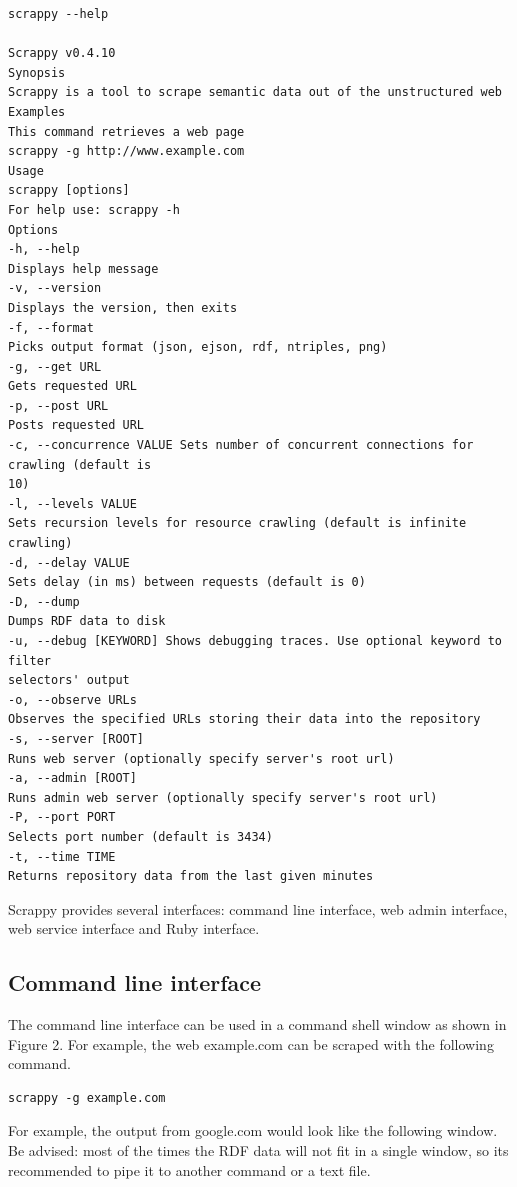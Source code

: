\begin{lstlisting}[style=consola, numbers=none]
scrappy --help

Scrappy v0.4.10
Synopsis
Scrappy is a tool to scrape semantic data out of the unstructured web
Examples
This command retrieves a web page
scrappy -g http://www.example.com
Usage
scrappy [options]
For help use: scrappy -h
Options
-h, --help
Displays help message
-v, --version
Displays the version, then exits
-f, --format
Picks output format (json, ejson, rdf, ntriples, png)
-g, --get URL
Gets requested URL
-p, --post URL
Posts requested URL
-c, --concurrence VALUE Sets number of concurrent connections for crawling (default is
10)
-l, --levels VALUE
Sets recursion levels for resource crawling (default is infinite
crawling)
-d, --delay VALUE
Sets delay (in ms) between requests (default is 0)
-D, --dump
Dumps RDF data to disk
-u, --debug [KEYWORD] Shows debugging traces. Use optional keyword to filter
selectors' output
-o, --observe URLs
Observes the specified URLs storing their data into the repository
-s, --server [ROOT]
Runs web server (optionally specify server's root url)
-a, --admin [ROOT]
Runs admin web server (optionally specify server's root url)
-P, --port PORT
Selects port number (default is 3434)
-t, --time TIME
Returns repository data from the last given minutes
\end{lstlisting}

Scrappy provides several interfaces: command line interface, web admin interface, web
service interface and Ruby interface.

\subsection{Command line interface}

The command line interface can be used in a command shell window as shown in Figure 2.
For example, the web example.com can be scraped with the following command.

\begin{lstlisting}[style=consola, numbers=none]
	scrappy -g example.com
\end{lstlisting}
For example, the output from google.com would look like the following window. Be advised:
most of the times the RDF data will not fit in a single window, so its recommended to pipe it to
another command or a text file.

